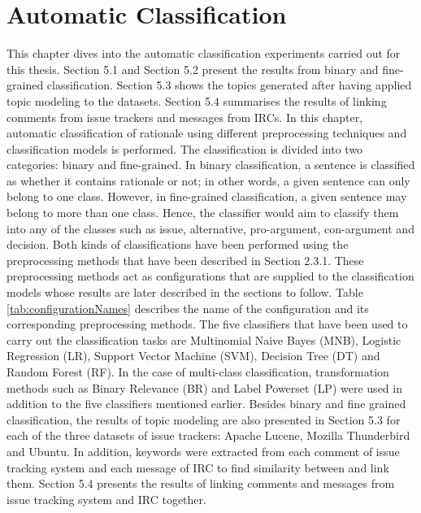 \documentclass[a4paper,12pt,twoside]{report}
\begin{document}
\chapter{Automatic Classification}
This chapter dives into the automatic classification experiments carried out for this thesis. Section 5.1 and Section 5.2 present the results from binary and fine-grained classification. Section 5.3 shows the topics generated after having applied topic modeling to the datasets. Section 5.4 summarises the results of linking comments from issue trackers and messages from \acs{IRC}s.
\newline \newline
In this chapter, automatic classification of rationale using different preprocessing techniques and classification models is performed. The classification is divided into two categories: binary and fine-grained. In binary classification, a sentence is classified as whether it contains rationale or not; in other words, a given sentence can only belong to one class. However, in fine-grained classification, a given sentence may belong to more than one class. Hence, the classifier would aim to classify them into any of the classes such as issue, alternative, pro-argument, con-argument and decision. Both kinds of classifications have been performed using the preprocessing methods that have been described in Section 2.3.1. These preprocessing methods act as configurations that are supplied to the classification models whose results are later described in the sections to follow. Table \ref{tab:configurationNames} describes the name of the configuration and its corresponding preprocessing methods. The five classifiers that have been used to carry out the classification tasks are Multinomial Naive Bayes (\acs{MNB}), Logistic Regression (\acs{LR}), Support Vector Machine (\acs{SVM}), Decision Tree (\acs{DT}) and Random Forest (\acs{RF}). In the case of multi-class classification, transformation methods such as Binary Relevance (\acs{BR}) and Label Powerset (\acs{LP}) were used in addition to the five classifiers mentioned earlier. 
\newline \newline
Besides binary and fine grained classification, the results of topic modeling are also presented in Section 5.3 for each of the three datasets of issue trackers: Apache Lucene, Mozilla Thunderbird and Ubuntu. In addition, keywords were extracted from each comment of issue tracking system and each message of \acs{IRC} to find similarity between and link them. Section 5.4 presents the results of linking comments and messages from issue tracking system and \acs{IRC} together. 
\end{document}
